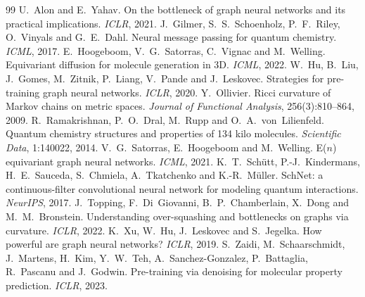 \documentclass[11pt,a4paper]{article}
\begin{document}
\begin{thebibliography}{99}
\small
{} U.~Alon and E.~Yahav. On the bottleneck of graph neural networks and its practical implications. \emph{ICLR}, 2021.
 J.~Gilmer, S.~S.~Schoenholz, P.~F.~Riley, O.~Vinyals and G.~E.~Dahl. Neural message passing for quantum chemistry. \emph{ICML}, 2017.
 E.~Hoogeboom, V.~G.~Satorras, C.~Vignac and M.~Welling. Equivariant diffusion for molecule generation in 3D. \emph{ICML}, 2022.
 W.~Hu, B.~Liu, J.~Gomes, M.~Zitnik, P.~Liang, V.~Pande and J.~Leskovec. Strategies for pre-training graph neural networks. \emph{ICLR}, 2020.
 Y.~Ollivier. Ricci curvature of Markov chains on metric spaces. \emph{Journal of Functional Analysis}, 256(3):810--864, 2009.
 R.~Ramakrishnan, P.~O.~Dral, M.~Rupp and O.~A.~von~Lilienfeld. Quantum chemistry structures and properties of 134 kilo molecules. \emph{Scientific Data}, 1:140022, 2014.
 V.~G.~Satorras, E.~Hoogeboom and M.~Welling. E($n$) equivariant graph neural networks. \emph{ICML}, 2021.
 K.~T.~Sch\"utt, P.-J.~Kindermans, H.~E.~Sauceda, S.~Chmiela, A.~Tkatchenko and K.-R.~M\"uller. SchNet: a continuous-filter convolutional neural network for modeling quantum interactions. \emph{NeurIPS}, 2017.
 J.~Topping, F.~Di~Giovanni, B.~P.~Chamberlain, X.~Dong and M.~M.~Bronstein. Understanding over-squashing and bottlenecks on graphs via curvature. \emph{ICLR}, 2022.
 K.~Xu, W.~Hu, J.~Leskovec and S.~Jegelka. How powerful are graph neural networks? \emph{ICLR}, 2019.
 S.~Zaidi, M.~Schaarschmidt, J.~Martens, H.~Kim, Y.~W.~Teh, A.~Sanchez-Gonzalez, P.~Battaglia, R.~Pascanu and J.~Godwin. Pre-training via denoising for molecular property prediction. \emph{ICLR}, 2023.
\end{thebibliography}
\end{document}
